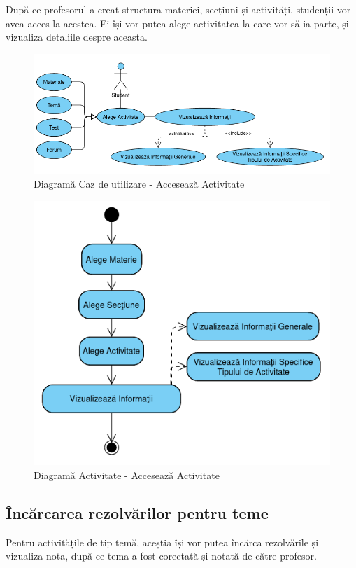 \documentclass[12pt, a4paper, oneside, romanian]{teza-upb}
\begin{document}
După ce profesorul a creat structura materiei, secțiuni și activități, studenții vor avea acces la acestea. Ei își vor putea alege activitatea la care vor să ia parte, și vizualiza detaliile despre aceasta.

\begin{figure}[H]
\centering
\includegraphics*[width=\columnwidth]{diagrama-use-case-acceseaza-activitate}
\caption{Diagramă Caz de utilizare - Accesează Activitate}
\label{diagrama-use-case-acceseaza-activitate}
\end{figure}


\begin{figure}[H]
\centering
\includegraphics*[width=0.6\columnwidth]{diagrama-activitate-acceseaza-activitate}
\caption{Diagramă Activitate - Accesează Activitate}
\label{diagrama-activitate-acceseaza-activitate}
\end{figure}

\subsection{Încărcarea rezolvărilor pentru teme}

Pentru activitățile de tip temă, aceștia își vor putea încărca rezolvările și vizualiza nota, după ce tema a fost corectată și notată de către profesor.
\end{document}

